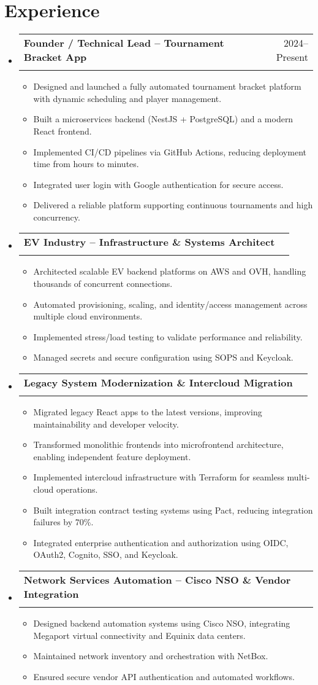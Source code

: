 \documentclass[letterpaper,11pt]{article}
\makeatletter
\newcommand{\resumeItem}[1]{
  \item\small{#1 \vspace{-2pt}}
}
\newcommand{\resumeSubheading}[4]{
  \vspace{-2pt}\item
    \begin{tabular*}{0.97\textwidth}[t]{l@{\extracolsep{\fill}}r}
      \textbf{#1} & #2 \\
      \textit{\small#3} & \textit{\small#4} \\
    \end{tabular*}\vspace{-7pt}
}
\newcommand{\resumeSubheadingListStart}{\begin{itemize}[leftmargin=0.15in, label={}]}
\newcommand{\resumeSubheadingListEnd}{\end{itemize}}
\newcommand{\resumeItemListStart}{\begin{itemize}[leftmargin=0.15in, noitemsep, label={$\cdot$}]}
\newcommand{\resumeItemListEnd}{\end{itemize}\vspace{-5pt}}
\makeatother
\begin{document}
\section{Experience}
  \resumeSubheadingListStart
    \resumeSubheading
      {Founder / Technical Lead – Tournament Bracket App}{2024–Present}
      {}{}
      \resumeItemListStart
        \resumeItem{Designed and launched a fully automated tournament bracket platform with dynamic scheduling and player management.}
        \resumeItem{Built a microservices backend (NestJS + PostgreSQL) and a modern React frontend.}
        \resumeItem{Implemented CI/CD pipelines via GitHub Actions, reducing deployment time from hours to minutes.}
        \resumeItem{Integrated user login with Google authentication for secure access.}
        \resumeItem{Delivered a reliable platform supporting continuous tournaments and high concurrency.}
      \resumeItemListEnd
    \resumeSubheading
      {EV Industry – Infrastructure \& Systems Architect}{}
      {}{}
      \resumeItemListStart
        \resumeItem{Architected scalable EV backend platforms on AWS and OVH, handling thousands of concurrent connections.}
        \resumeItem{Automated provisioning, scaling, and identity/access management across multiple cloud environments.}
        \resumeItem{Implemented stress/load testing to validate performance and reliability.}
        \resumeItem{Managed secrets and secure configuration using SOPS and Keycloak.}
      \resumeItemListEnd
    \resumeSubheading
      {Legacy System Modernization \& Intercloud Migration}{}
      {}{}
      \resumeItemListStart
        \resumeItem{Migrated legacy React apps to the latest versions, improving maintainability and developer velocity.}
        \resumeItem{Transformed monolithic frontends into microfrontend architecture, enabling independent feature deployment.}
        \resumeItem{Implemented intercloud infrastructure with Terraform for seamless multi-cloud operations.}
        \resumeItem{Built integration contract testing systems using Pact, reducing integration failures by 70\%.}
        \resumeItem{Integrated enterprise authentication and authorization using OIDC, OAuth2, Cognito, SSO, and Keycloak.}
      \resumeItemListEnd
    \resumeSubheading
      {Network Services Automation – Cisco NSO \& Vendor Integration}{}
      {}{}
      \resumeItemListStart
        \resumeItem{Designed backend automation systems using Cisco NSO, integrating Megaport virtual connectivity and Equinix data centers.}
        \resumeItem{Maintained network inventory and orchestration with NetBox.}
        \resumeItem{Ensured secure vendor API authentication and automated workflows.}
      \resumeItemListEnd
  \resumeSubheadingListEnd
\end{document}
